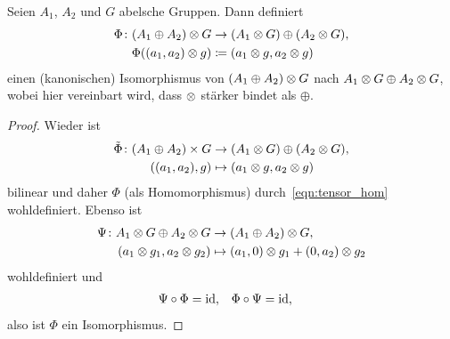 \begin{bemerkung}
\label{bem:tensor_summen_iso}
  Seien $A_1$, $A_2$ und $G$ abelsche Gruppen.
  Dann definiert
  \begin{align*}
    \Phi \colon (A_1 \oplus A_2) \otimes G & \to (A_1 \otimes G) \oplus (A_2 \otimes G),\\
    \Phi( (a_1,a_2) \otimes g) & \coloneqq (a_1 \otimes g, a_2 \otimes g)
  \end{align*}
  einen (kanonischen) Isomorphismus von $(A_1 \oplus A_2) \otimes G$ nach $A_1 \otimes G \oplus A_2 \otimes G$, wobei hier vereinbart wird, dass $\otimes$ stärker bindet als $\oplus$.
\end{bemerkung}
\begin{proof}
  Wieder ist
  \begin{align*}
    \tilde \Phi \colon (A_1 \oplus A_2) \times G & \to (A_1 \otimes G) \oplus (A_2 \otimes G), \\
    ( (a_1, a_2), g) & \mapsto (a_1 \otimes g, a_2 \otimes g)
  \end{align*}
  bilinear und daher $\Phi$ (als Homomorphismus) durch~\eqref{eqn:tensor_hom} wohldefiniert.
  Ebenso ist
  \begin{align*}
    \Psi \colon A_1 \otimes G \oplus A_2 \otimes G & \to (A_1 \oplus A_2) \otimes G, \\
    (a_1 \otimes g_1, a_2 \otimes g_2) & \mapsto (a_1,0) \otimes g_1 + (0,a_2) \otimes g_2
  \end{align*}
  wohldefiniert und
  \begin{align*}
    \Psi \circ \Phi & = \operatorname{id},
    & \Phi \circ \Psi & = \operatorname{id},
  \end{align*}
  also ist $\Phi$ ein Isomorphismus.
\end{proof}

